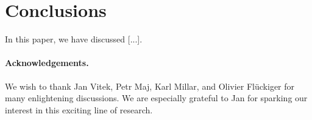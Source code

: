 \section{Conclusions}
\label{se:conclusions}

In this paper, we have discussed [...].

\ifx\noauthorea\undefined
\paragraph{Acknowledgements.}

We wish to thank Jan Vitek, Petr Maj, Karl Millar, and Olivier Fl{\"u}ckiger for many enlightening discussions. We are especially grateful to Jan for sparking our interest in this exciting line of research. %
\fi
